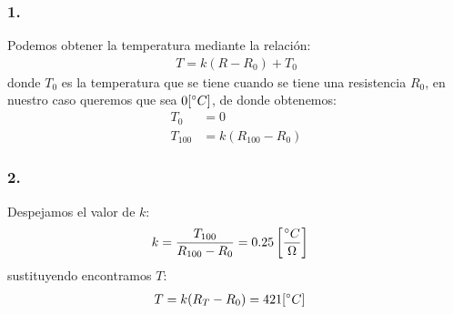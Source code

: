 \documentclass{article}
\begin{document}
\begin{tcolorbox}[breakable]
    \subsubsection*{1.}
    Podemos obtener la temperatura mediante la relación:
    \begin{align*}
        T = k(R-R_0) + T_0
    \end{align*}
    donde $T_0$ es la temperatura que se tiene cuando se tiene una resistencia $R_0$,
    en nuestro caso queremos que sea $0 [\degree C]$, de donde obtenemos:
    \begin{align*}
        T_0 &= 0  \\
        T_{100} &= k(R_{100}-R_0) 
    \end{align*}
    \subsubsection*{2.}
    Despejamos el valor de $k$:
    \begin{align*}
        k &= \frac{T_{100}}{R_{100}-R_0} = 0.25 \left[ \frac{\degree C}{\Omega} \right]
    \end{align*}
    sustituyendo encontramos $T$:
    \begin{align*}
        T &= k(R_{T} - R_{0}) = 421 [\degree C] 
    \end{align*}

\end{tcolorbox}
\end{document}
